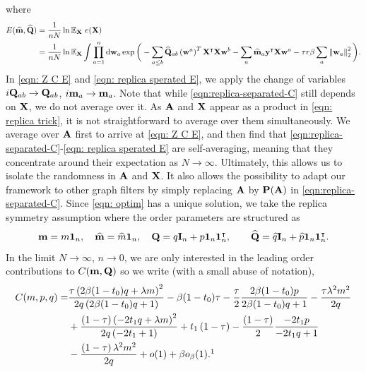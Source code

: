 \documentclass[9pt,twocolumn]{pnas-new}
\begin{document}
where 
\begin{equation}\label{eqn: replica sperated E}
\begin{aligned}
    E(\widehat{\mathbf{m}},\widehat{\mathbf{Q}}) 
    &= \frac{1}{nN} \ln \mathbb{E}_{\mathbf{X}}~e(\mathbf{X})\\
    &=\frac{1}{nN}\ln \mathbb{E}_{\mathbf{X}}\int\prod_{a=1}^{n}\mathrm{d}\mathbf{w}_{a}\exp\bigg(-\sum_{a\leq b}\widehat{\mathbf{Q}}_{ab}\left(\mathbf{w}^{a}\right)^{T}\mathbf{X}^{\intercal}\mathbf{X}\mathbf{w}^{b}-\sum_{a}\widehat{\mathbf{m}}_{a}\mathbf{y}^{\intercal}\mathbf{X}\mathbf{w}^{a}- \tau r\beta \sum_a \left\lVert\mathbf{w}_a\right\rVert_2^2\bigg).
    \end{aligned}
\end{equation}
In \eqref{eqn: Z C E} and \eqref{eqn: replica sperated E}, we apply the change of variables $i\mathbf{Q}_{ab}\to\mathbf{Q}_{ab}$,  $i\mathbf{m}_{a}\to\mathbf{m}_{a}$.
Note that while \eqref{eqn:replica-separated-C} still depends on $\mathbf{X}$, we do not average over it.  As $\mathbf{A}$ and $\mathbf{X}$ appear as a product in \eqref{eqn:  replica trick}, it is not straightforward to average over them simultaneously. We average over $\mathbf{A}$ first to arrive at \eqref{eqn: Z C E}, and then find that \eqref{eqn:replica-separated-C}-\eqref{eqn: replica sperated E} are self-averaging, meaning that they concentrate around their expectation as $N \to \infty$. Ultimately, this allows us to isolate the randomness in $\mathbf{A}$ and $\mathbf{X}$. It also allows the possibility to adapt our framework to other graph filters by simply replacing $\mathbf{A}$ by $\mathbf{P}(\mathbf{A})$ in \eqref{eqn:replica-separated-C}. Since \eqref{eqn: optim} has a unique solution, we take the replica symmetry assumption where the order parameters are structured as
\begin{equation}\label{eqn: replica sys}
    \mathbf{m}=m{\bf{1}}_n,\quad  \widehat{\mathbf{m}}=\widehat{m}{\bf{1}}_n, \quad \mathbf{Q}=q \mathbf{I}_n+ p  {\bf{1}}_n{\bf{1}}_n^\intercal,  \quad \quad \widehat{\mathbf{Q}}= \widehat{q} 
    \mathbf{I}_n+ \widehat{p}{\bf{1}}_n{\bf{1}}_n^\intercal.
\end{equation}
In the limit $N\to\infty$, $n\to 0$, we are only interested in the leading order contributions to $C(\mathbf{m},\mathbf{Q})$ so we write (with a small abuse of notation),
\begin{equation}\label{eqn: C m p q}
\begin{aligned}
        C(m,p,q)=&\frac{ \tau \left(2 \beta(1-t_0) q+\lambda m\right)^{2}}{2q\left(2 \beta(1-t_0) q+1\right)} -\beta(1-t_0)\tau  -\frac{ \tau}{2}\frac{2\beta(1-t_0) p}{2\beta(1-t_0) q+1}-\frac{ \tau \lambda^2 m^2}{2q}\\
        &+\frac{ \left(1-\tau\right)  \left(-2t_1 q+\lambda m\right)^{2}}{2q\left(-2t_1+1\right)} +t_1   \left(1-\tau\right)  -\frac{\left(1-\tau\right)}{2}\frac{-2t_1 p}{-2t_1 q+1} \\
    &-\frac{\left(1-\tau\right) \lambda^2 m^2}{2q}+ o(1)+\beta o_\beta(1).\footnotemark
\end{aligned}
\end{equation}
\end{document}
